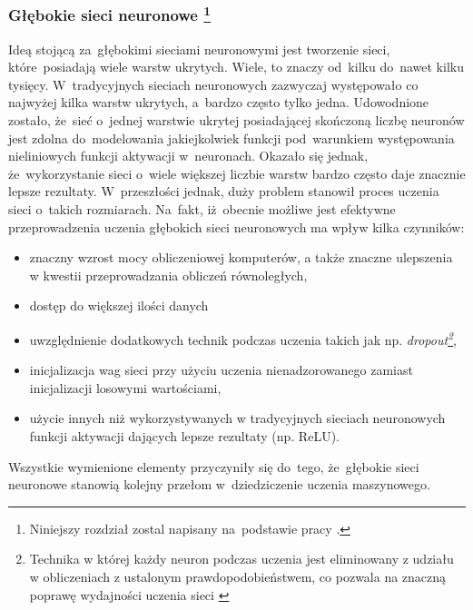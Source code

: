 \subsubsection[Głębokie sieci neuronowe]{Głębokie sieci neuronowe \footnote{Niniejszy rozdział zostal napisany na~podstawie pracy \cite{dnn1}. }}\label{dnn}
Ideą stojącą za~głębokimi sieciami neuronowymi jest tworzenie sieci, które~posiadają wiele warstw ukrytych. Wiele, to znaczy od~kilku do~nawet kilku tysięcy. W~tradycyjnych sieciach neuronowych zazwyczaj występowało co najwyżej kilka warstw ukrytych, a~bardzo często tylko jedna. Udowodnione zostało, że~sieć o~jednej warstwie ukrytej posiadającej skończoną liczbę neuronów jest zdolna do~modelowania jakiejkolwiek funkcji pod~warunkiem występowania nieliniowych funkcji aktywacji w~neuronach\cite{anntheorem}. Okazało się jednak, że~wykorzystanie sieci o~wiele większej liczbie warstw bardzo często daje znacznie lepsze rezultaty. W~przeszłości jednak, duży problem stanowił proces uczenia sieci o~takich rozmiarach. Na~fakt, iż~obecnie możliwe jest efektywne przeprowadzenia uczenia głębokich sieci neuronowych ma wpływ kilka czynników:
\begin{itemize}
\item znaczny wzrost mocy obliczeniowej komputerów, a także znaczne ulepszenia w kwestii przeprowadzania obliczeń równoległych,
\item dostęp do większej ilości danych
\item uwzględnienie dodatkowych technik podczas uczenia takich jak np. \textit{dropout\footnote{Technika w której każdy neuron podczas uczenia jest eliminowany z udziału w obliczeniach z ustalonym prawdopodobieństwem, co pozwala na znaczną poprawę wydajności uczenia sieci \cite{srivastava2014dropout}}},
\item inicjalizacja wag sieci przy użyciu uczenia nienadzorowanego zamiast inicjalizacji losowymi wartościami,
\item użycie innych niż wykorzystywanych w tradycyjnych sieciach neuronowych funkcji aktywacji dających lepsze rezultaty (np. ReLU).
\end{itemize}
Wszystkie wymienione elementy przyczyniły się do~tego, że~głębokie sieci neuronowe stanowią kolejny przełom w~dziedziczenie uczenia maszynowego.

